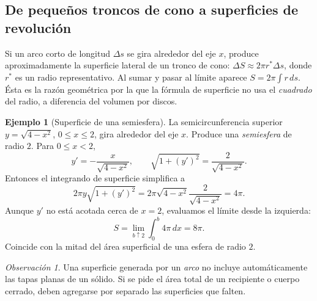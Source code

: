 \documentclass[12pt]{article}
\theoremstyle{definition}
\newtheorem{ejemplo}[teorema]{Ejemplo}
\theoremstyle{remark}
\newtheorem*{observacion}{Observación}
\begin{document}
\subsection*{De pequeños troncos de cono a superficies de revolución}
Si un arco corto de longitud $\Delta s$ se gira alrededor del eje $x$, produce aproximadamente la superficie lateral de un tronco de cono: $\Delta S\approx2\pi r^*\Delta s$, donde $r^*$ es un radio representativo. Al sumar y pasar al límite aparece $S=2\pi\int r\,ds$. Ésta es la razón geométrica por la que la fórmula de superficie no usa el \emph{cuadrado} del radio, a diferencia del volumen por discos.
\begin{ejemplo}[Superficie de una semiesfera]
La semicircunferencia superior $y=\sqrt{4-x^2}$, $0\le x\le2$, gira alrededor del eje $x$. Produce una \emph{semiesfera} de radio $2$. Para $0\le x<2$,
\[
y'=-\frac{x}{\sqrt{4-x^2}},
\qquad
\sqrt{1+(y')^2}=\frac2{\sqrt{4-x^2}}.
\]
Entonces el integrando de superficie simplifica a
\[
2\pi y\sqrt{1+(y')^2}
=2\pi\sqrt{4-x^2}\frac2{\sqrt{4-x^2}}=4\pi.
\]
Aunque $y'$ no está acotada cerca de $x=2$, evaluamos el límite desde la izquierda:
\[
S=\lim_{b\uparrow2}\int_0^b4\pi\,dx
=\boxed{8\pi}.
\]
Coincide con la mitad del área superficial de una esfera de radio $2$.
\end{ejemplo}
\begin{observacion}
Una superficie generada por un \emph{arco} no incluye automáticamente las tapas planas de un sólido. Si se pide el área total de un recipiente o cuerpo cerrado, deben agregarse por separado las superficies que falten.
\end{observacion}

\end{document}

